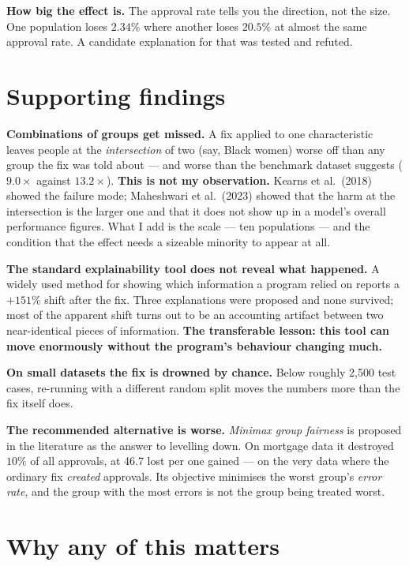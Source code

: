 \documentclass[11pt,a4paper]{article}
\begin{document}
\textbf{How big the effect is.} The approval rate tells you the direction, not the size. One
population loses $2.34\%$ where another loses $20.5\%$ at almost the same approval rate. A
candidate explanation for that was tested and refuted.

\section{Supporting findings}

\textbf{Combinations of groups get missed.} A fix applied to one characteristic leaves
people at the \emph{intersection} of two (say, Black women) worse off than any group the fix
was told about --- and worse than the benchmark dataset suggests ($9.0\times$ against
$13.2\times$). \textbf{This is not my observation.} Kearns et al.\ (2018) showed the failure
mode; Maheshwari et al.\ (2023) showed that the harm at the intersection is the larger one
and that it does not show up in a model's overall performance figures. What I add is the
scale --- ten populations --- and the condition that the effect needs a sizeable minority to
appear at all.

\textbf{The standard explainability tool does not reveal what happened.} A widely used method
for showing which information a program relied on reports a $+151\%$ shift after the fix.
Three explanations were proposed and none survived; most of the apparent shift turns out to
be an accounting artifact between two near-identical pieces of information. \textbf{The
transferable lesson: this tool can move enormously without the program's behaviour changing
much.}

\textbf{On small datasets the fix is drowned by chance.} Below roughly 2{,}500 test cases,
re-running with a different random split moves the numbers more than the fix itself does.

\textbf{The recommended alternative is worse.} \emph{Minimax group fairness} is proposed in
the literature as the answer to levelling down. On mortgage data it destroyed $10\%$ of all
approvals, at 46.7 lost per one gained --- on the very data where the ordinary fix
\emph{created} approvals. Its objective minimises the worst group's \emph{error rate}, and
the group with the most errors is not the group being treated worst.

\section{Why any of this matters}
\end{document}
